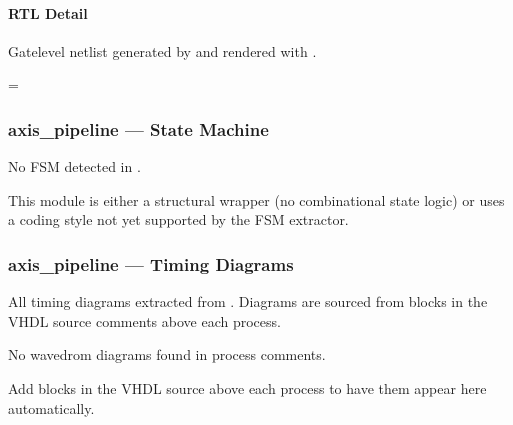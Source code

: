 \documentclass[letterpaper,10pt,english]{sphinxmanual}
\begin{document}
\paragraph{RTL Detail}
\label{\detokenize{modules/axis_pipeline/block:rtl-detail}}
\sphinxAtStartPar
Gate\sphinxhyphen{}level netlist generated by  and rendered with .

\begin{landscape}
\makeatletter
\spx@image@maxheight=\dimexpr{}\baselineskip\relax
\makeatother


\end{landscape}

\sphinxstepscope


\subsubsection{axis\_pipeline — State Machine}
\label{\detokenize{modules/axis_pipeline/fsm:axis-pipeline-state-machine}}\label{\detokenize{modules/axis_pipeline/fsm::doc}}
\sphinxAtStartPar
No FSM detected in .

\sphinxAtStartPar
This module is either a structural wrapper (no combinational
state logic) or uses a coding style not yet supported by the
FSM extractor.

\sphinxstepscope


\subsubsection{axis\_pipeline — Timing Diagrams}
\label{\detokenize{modules/axis_pipeline/timing:axis-pipeline-timing-diagrams}}\label{\detokenize{modules/axis_pipeline/timing::doc}}
\sphinxAtStartPar
All timing diagrams extracted from .
Diagrams are sourced from  blocks in the VHDL
source comments above each process.

\sphinxAtStartPar
No wavedrom diagrams found in process comments.

\sphinxAtStartPar
Add  blocks in the VHDL source above each
process to have them appear here automatically.
\end{document}
